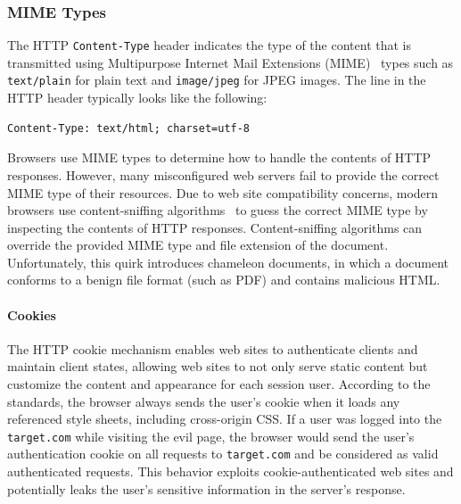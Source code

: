 \documentclass{acm_proc_article-sp}
\begin{document}
\subsubsection{MIME Types}
The HTTP \texttt{Content-Type} header indicates the type of the content that is transmitted using Multipurpose Internet Mail Extensions (MIME)~\cite{mime} types such as \texttt{text/plain} for plain text and \texttt{image/jpeg} for JPEG images. The line in the HTTP header typically looks like the following:
\begin{verbatim}
Content-Type: text/html; charset=utf-8
\end{verbatim}
Browsers use MIME types to determine how to handle the contents of HTTP responses. However, many misconfigured web servers fail to provide the correct MIME type of their resources. Due to web site compatibility concerns, modern browsers use content-sniffing algorithms~\cite{securecontentsniffing} to guess the correct MIME type by inspecting the contents of HTTP responses.  Content-sniffing algorithms can override the provided MIME type and file extension of the document. Unfortunately, this quirk introduces chameleon documents, in which a document conforms to a benign file format (such as PDF) and contains malicious HTML.

\paragraph{Cookies}
The HTTP cookie mechanism enables web sites to authenticate clients and maintain client states, allowing web sites to not only serve static content but customize the content and appearance for each session user. According to the standards, the browser always sends the user's cookie when it loads any referenced style sheets, including cross-origin CSS. If a user was logged into the \texttt{target.com} while visiting the evil page, the browser would send the user's authentication cookie on all requests to \texttt{target.com} and be considered as valid authenticated requests. This behavior exploits cookie-authenticated web sites and potentially leaks the user's sensitive information in the server's response.
\end{document}
